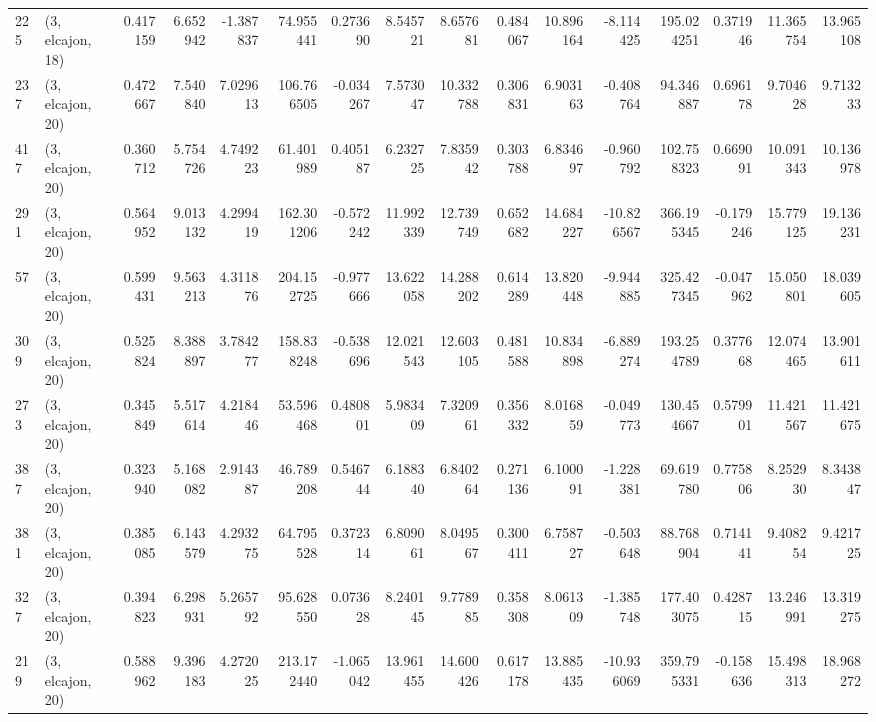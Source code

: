 \begin{tabular}{llrrrrrrrrrrrrrr}
225 &  (3, elcajon, 18) &   0.417159 &   6.652942 &  -1.387837 &    74.955441 &   0.273690 &   8.545721 &   8.657681 &  0.484067 &  10.896164 &  -8.114425 &   195.024251 &   0.371946 &  11.365754 &  13.965108 \\
237 &  (3, elcajon, 20) &   0.472667 &   7.540840 &   7.029613 &   106.766505 &  -0.034267 &   7.573047 &  10.332788 &  0.306831 &   6.903163 &  -0.408764 &    94.346887 &   0.696178 &   9.704628 &   9.713233 \\
417 &  (3, elcajon, 20) &   0.360712 &   5.754726 &   4.749223 &    61.401989 &   0.405187 &   6.232725 &   7.835942 &  0.303788 &   6.834697 &  -0.960792 &   102.758323 &   0.669091 &  10.091343 &  10.136978 \\
291 &  (3, elcajon, 20) &   0.564952 &   9.013132 &   4.299419 &   162.301206 &  -0.572242 &  11.992339 &  12.739749 &  0.652682 &  14.684227 & -10.826567 &   366.195345 &  -0.179246 &  15.779125 &  19.136231 \\
57  &  (3, elcajon, 20) &   0.599431 &   9.563213 &   4.311876 &   204.152725 &  -0.977666 &  13.622058 &  14.288202 &  0.614289 &  13.820448 &  -9.944885 &   325.427345 &  -0.047962 &  15.050801 &  18.039605 \\
309 &  (3, elcajon, 20) &   0.525824 &   8.388897 &   3.784277 &   158.838248 &  -0.538696 &  12.021543 &  12.603105 &  0.481588 &  10.834898 &  -6.889274 &   193.254789 &   0.377668 &  12.074465 &  13.901611 \\
273 &  (3, elcajon, 20) &   0.345849 &   5.517614 &   4.218446 &    53.596468 &   0.480801 &   5.983409 &   7.320961 &  0.356332 &   8.016859 &  -0.049773 &   130.454667 &   0.579901 &  11.421567 &  11.421675 \\
387 &  (3, elcajon, 20) &   0.323940 &   5.168082 &   2.914387 &    46.789208 &   0.546744 &   6.188340 &   6.840264 &  0.271136 &   6.100091 &  -1.228381 &    69.619780 &   0.775806 &   8.252930 &   8.343847 \\
381 &  (3, elcajon, 20) &   0.385085 &   6.143579 &   4.293275 &    64.795528 &   0.372314 &   6.809061 &   8.049567 &  0.300411 &   6.758727 &  -0.503648 &    88.768904 &   0.714141 &   9.408254 &   9.421725 \\
327 &  (3, elcajon, 20) &   0.394823 &   6.298931 &   5.265792 &    95.628550 &   0.073628 &   8.240145 &   9.778985 &  0.358308 &   8.061309 &  -1.385748 &   177.403075 &   0.428715 &  13.246991 &  13.319275 \\
219 &  (3, elcajon, 20) &   0.588962 &   9.396183 &   4.272025 &   213.172440 &  -1.065042 &  13.961455 &  14.600426 &  0.617178 &  13.885435 & -10.936069 &   359.795331 &  -0.158636 &  15.498313 &  18.968272 \\

\end{tabular}
